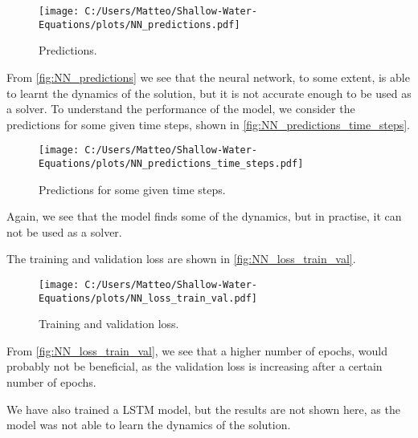 \begin{figure}[H]
    \centering
    \texttt{[image: C:/Users/Matteo/Shallow-Water-Equations/plots/NN\_predictions.pdf]}
    \caption{Predictions.}\label{fig:NN_predictions}
\end{figure}
From \autoref{fig:NN_predictions} we see that the neural network, to some extent, is able to learnt the dynamics of the solution, but it is not accurate enough to be used as a solver.
To understand the performance of the model, we consider the predictions for some given time steps, shown in \autoref{fig:NN_predictions_time_steps}.
\begin{figure}[H]
    \centering
    \texttt{[image: C:/Users/Matteo/Shallow-Water-Equations/plots/NN\_predictions\_time\_steps.pdf]}
    \caption{Predictions for some given time steps.}\label{fig:NN_predictions_time_steps}
\end{figure}
Again, we see that the model finds some of the dynamics, but in practise, it can not be used as a solver.

The training and validation loss are shown in \autoref{fig:NN_loss_train_val}.
\begin{figure}[H]
    \centering
    \texttt{[image: C:/Users/Matteo/Shallow-Water-Equations/plots/NN\_loss\_train\_val.pdf]}
    \caption{Training and validation loss.}\label{fig:NN_loss_train_val}
\end{figure}
From \autoref{fig:NN_loss_train_val}, we see that a higher number of epochs, would probably not be beneficial, as the validation loss is increasing after a certain number of epochs.

We have also trained a LSTM model, but the results are not shown here, as the model was not able to learn the dynamics of the solution.



